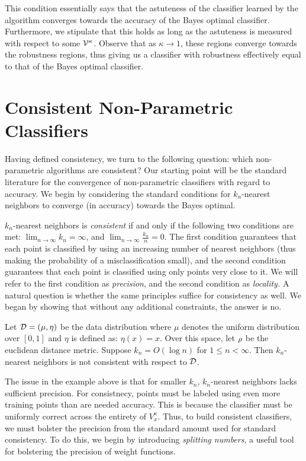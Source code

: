 This condition essentially says that the astuteness of the classifier learned by the algorithm converges towards the accuracy of the Bayes optimal classifier. Furthermore, we stipulate that this holds as long as the astuteness is measured with respect to some ${\mathcal V}^\kappa$. Observe that as $\kappa \to 1$, these regions converge towards the \natural\emph{ }robustness regions, thus giving us a classifier with robustness effectively equal to that of the \natural\emph{ }Bayes optimal classifier. 

\section{\Ncons\emph{ }Consistent Non-Parametric Classifiers}

Having defined \ncons\emph{ }consistency, we turn to the following question: which non-parametric algorithms are \ncons\emph{ }consistent? Our starting point will be the standard literature for the convergence of non-parametric classifiers with regard to accuracy. We begin by considering the standard conditions for $k_n$-nearest neighbors to converge (in accuracy) towards the Bayes optimal.

$k_n$-nearest neighbors is \textit{consistent} if and only if the following two conditions are met:  $\lim_{n \to \infty} k_n = \infty$, and $\lim_{n \to \infty} \frac{k_n}{n} = 0$. The first condition guarantees that each point is classified by using an increasing number of nearest neighbors (thus making the probability of a misclassification small), and the second condition guarantees that each point is classified using only points very close to it. We will refer to the first condition as \textit{precision}, and the second condition as \textit{locality.}  A natural question is whether the same principles suffice for \ncons\emph{ }consistency as well. We began by showing that without any additional constraints, the answer is no.

\begin{thm}\label{thm:lower_bound}
Let ${\mathcal D} = (\mu, \eta)$ be the data distribution where $\mu$ denotes the uniform distribution over $[0,1]$ and $\eta$ is defined as: $\eta(x) = x$. Over this space, let $\rho$ be the euclidean distance metric. Suppose $k_n = O(\log n)$ for $1 \leq n < \infty$. Then $k_n$-nearest neighbors is not \ncons\emph{ }consistent with respect to ${\mathcal D}$. 
\end{thm}

The issue in the example above is that for smaller $k_n$, $k_n$-nearest neighbors lacks sufficient precision. For \ncons\emph{ }consistnecy, points must be labeled using even more training points than are needed accuracy. This is because the classifier must be uniformly correct across the entirety of $V_x^\kappa$. Thus, to build \ncons\emph{ }consistent classifiers, we must bolster the precision from the standard amount used for standard consistency. To do this, we begin by introducing \textit{splitting numbers}, a useful tool for bolstering the precision of weight functions.

